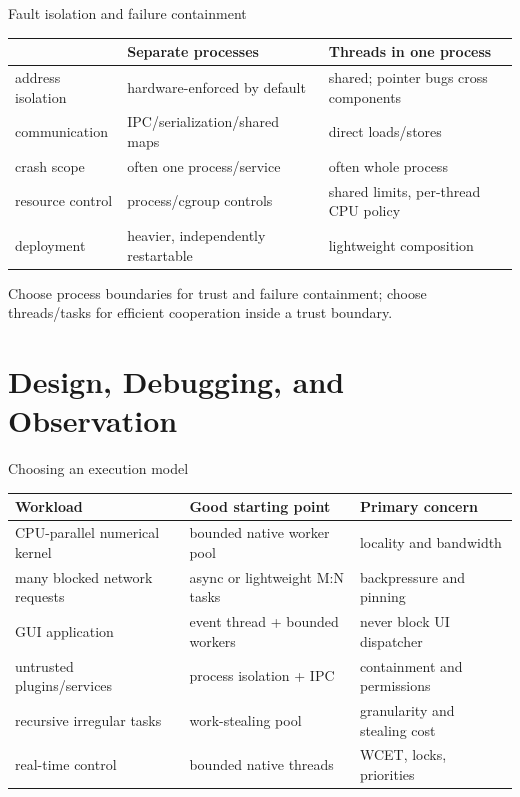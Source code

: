 \documentclass[aspectratio=169,11pt]{beamer}
\begin{document}
\begin{frame}{Fault isolation and failure containment}
  \small
  \begin{tabularx}{\textwidth}{@{}lXX@{}}
    \toprule
    & \textbf{Separate processes} & \textbf{Threads in one process} \\
    \midrule
    address isolation & hardware-enforced by default & shared; pointer bugs cross components \\
    communication & IPC/serialization/shared maps & direct loads/stores \\
    crash scope & often one process/service & often whole process \\
    resource control & process/cgroup controls & shared limits, per-thread CPU policy \\
    deployment & heavier, independently restartable & lightweight composition \\
    \bottomrule
  \end{tabularx}
  \begin{tcolorbox}[title=Architecture principle,colback=osorange!5,colframe=osorange!70]
    Choose process boundaries for trust and failure containment; choose threads/tasks for efficient cooperation inside a trust boundary.
  \end{tcolorbox}
\end{frame}

\section{Design, Debugging, and Observation}

\begin{frame}{Choosing an execution model}
  \small
  \begin{tabularx}{\textwidth}{@{}lXX@{}}
    \toprule
    \textbf{Workload} & \textbf{Good starting point} & \textbf{Primary concern} \\
    \midrule
    CPU-parallel numerical kernel & bounded native worker pool & locality and bandwidth \\
    many blocked network requests & async or lightweight M:N tasks & backpressure and pinning \\
    GUI application & event thread + bounded workers & never block UI dispatcher \\
    untrusted plugins/services & process isolation + IPC & containment and permissions \\
    recursive irregular tasks & work-stealing pool & granularity and stealing cost \\
    real-time control & bounded native threads & WCET, locks, priorities \\
    \bottomrule
  \end{tabularx}
\end{frame}
\end{document}
